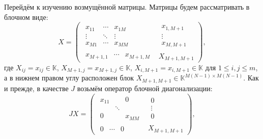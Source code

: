 Перейдём к изучению возмущённой матрицы.
Матрицы будем рассматривать в блочном виде:
\[
    X =
        \left(\begin{array}{c|c}
            \begin{matrix}
                x_{11} & \cdots & x_{1M} \\
                \vdots & \ddots & \vdots \\
                x_{M1} & \cdots & x_{MM}
            \end{matrix} &
            \begin{matrix}
                x_{1,M+1} \\
                \vdots \\
                x_{M,M+1}
            \end{matrix} \\ \hline
            \begin{matrix}
                x_{M+1,1} &
                \cdots &
                x_{M+1,M}
            \end{matrix} &
            X_{M+1,M+1}
        \end{array}\right),
    \]
где
\( X_{ij}      {=} x_{ij}      {\in} \mathbb{K} \),
\( X_{M{+}1,j} {=} x_{M{+}1,j} {\in} \mathbb{K} \),
\( X_{i,M{+}1} {=} x_{i,M{+}1} {\in} \mathbb{K} \)
для \( 1\leq i,j \leq m \),
а в нижнем правом углу расположен блок
\( X_{M{+}1,M{+}1} {\in} \mathbb{K}^{M(N{-}1){\times}M(N-1)} \).
Как и прежде, в качестве \( J \)
возьмём оператор блочной диагонализации:
\[
    J X =
        \left(\begin{array}{c|c}
            \begin{matrix}
                x_{11} &  & 0 \\
                 & \ddots &  \\
                0 &  & x_{MM}
            \end{matrix} &
            \begin{matrix}
                0 \\
                \vdots \\
                0
            \end{matrix} \\ \hline
            \begin{matrix}
                0 & \cdots & 0
            \end{matrix} &
            X_{M+1,M+1}
        \end{array}\right),
    \]
